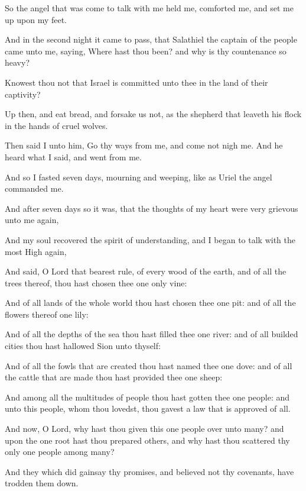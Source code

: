 {\par }{\PP {}So the angel that was come to talk with me held me, comforted me, and set me up upon my feet.
\par }{\PP {}And in the second night it came to pass, that Salathiel the captain of the people came unto me, saying, Where hast thou been? and why is thy countenance so heavy?
\par }{\PP {}Knowest thou not that Israel is committed unto thee in the land of their captivity?
\par }{\PP {}Up then, and eat bread, and forsake us not, as the shepherd that leaveth his flock in the hands of cruel wolves.
\par }{\PP {}Then said I unto him, Go thy ways from me, and come not nigh me. And he heard what I said, and went from me.
\par }{\PP {}And so I fasted seven days, mourning and weeping, like as Uriel the angel commanded me.
\par }{\PP {}And after seven days so it was, that the thoughts of my heart were very grievous unto me again,
\par }{\PP {}And my soul recovered the spirit of understanding, and I began to talk with the most High again,
\par }{\PP {}And said, O Lord that bearest rule, of every wood of the earth, and of all the trees thereof, thou hast chosen thee one only vine:
\par }{\PP {}And of all lands of the whole world thou hast chosen thee one pit: and of all the flowers thereof one lily:
\par }{\PP {}And of all the depths of the sea thou hast filled thee one river: and of all builded cities thou hast hallowed Sion unto thyself:
\par }{\PP {}And of all the fowls that are created thou hast named thee one dove: and of all the cattle that are made thou hast provided thee one sheep:
\par }{\PP {}And among all the multitudes of people thou hast gotten thee one people: and unto this people, whom thou lovedst, thou gavest a law that is approved of all.
\par }{\PP {}And now, O Lord, why hast thou given this one people over unto many? and upon the one root hast thou prepared others, and why hast thou scattered thy only one people among many?
\par }{\PP {}And they which did gainsay thy promises, and believed not thy covenants, have trodden them down.
}
